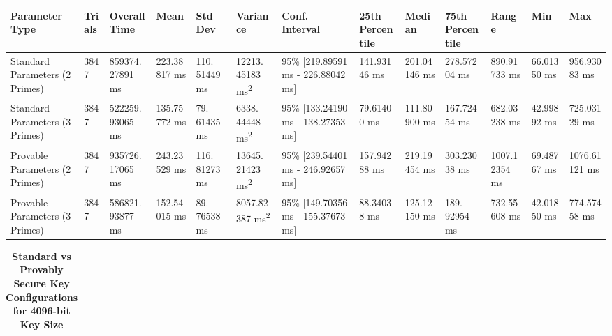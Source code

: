 \documentclass[]{final_report}
\theoremstyle{definition}
\begin{document}
\begin{landscape}
\begin{table}[H]
\begin{tabular}{|p{2.5cm}|p{1cm}|p{1.5cm}|p{1.5cm}|p{1.3cm}|p{1.5cm}|p{2.5cm}|p{1.5cm}|p{1.5cm}|p{1.5cm}|p{1.5cm}|p{1.5cm}|p{1.6cm}|}
\hline
\textbf{Parameter Type} & \textbf{Trials} & \textbf{Overall Time} & \textbf{Mean} & \textbf{Std Dev} & \textbf{Variance} & \textbf{Conf. Interval} & \textbf{25th Percentile} & \textbf{Median} & \textbf{75th Percentile} & \textbf{Range} & \textbf{Min} & \textbf{Max} \\
\hline
Standard Parameters (2 Primes) & 3847 & 859374.
27891 ms & 223.38817 ms & 110.
51449 ms & 12213.
45183 ms\textsuperscript{2} & 95\% [219.89591 ms - 226.88042 ms] & 141.93146 ms & 201.04146 ms & 278.57204 ms & 890.91733 ms & 66.01350 ms & 956.93083 ms \\
\hline
Standard Parameters (3 Primes) & 3847 & 522259.
93065 ms & 135.75772 ms & 79.
61435 ms & 6338.
44448 ms\textsuperscript{2} & 95\% [133.24190 ms - 138.27353 ms] & 79.61400 ms & 111.80900 ms & 167.72454 ms & 682.03238 ms & 42.99892 ms & 725.03129 ms \\
\hline
Provable Parameters (2 Primes) & 3847 & 935726.
17065 ms & 243.23529 ms & 116.
81273 ms & 13645.
21423 ms\textsuperscript{2} & 95\% [239.54401 ms - 246.92657 ms] & 157.94288 ms & 219.19454 ms & 303.23038 ms & 1007.12354 ms & 69.48767 ms & 1076.61121 ms \\
\hline
Provable Parameters (3 Primes) & 3847 & 586821.
93877 ms & 152.54015 ms & 89.
76538 ms & 8057.82387 ms\textsuperscript{2} & 95\% [149.70356 ms - 155.37673 ms] & 88.34038 ms & 125.12150 ms & 189.
92954 ms & 732.55608 ms & 42.01850 ms & 774.57458 ms \\
\hline
\end{tabular}
\label{keyGen_3072bit_table}
\end{table}
\begin{table}[H]
\caption{\textbf{Standard vs Provably Secure Key Configurations for 4096-bit Key Size}}
\centering

\begin{tabular}{|p{2.5cm}|p{1cm}|p{1.5cm}|p{1.5cm}|p{1.5cm}|p{1.5cm}|p{2.5cm}|p{1.5cm}|p{1.5cm}|p{1.5cm}|p{1.5cm}|p{1.5cm}|p{1.65cm}|}


\end{tabular}
\end{table}
\end{landscape}
\end{document}
